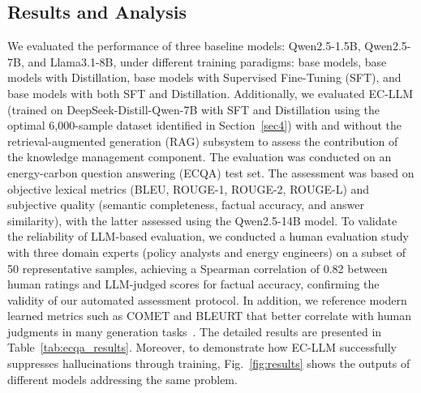 \documentclass[]{interact}
\theoremstyle{plain}%
\theoremstyle{definition}
\theoremstyle{remark}
\begin{document}
\subsection{Results and Analysis}
We evaluated the performance of three baseline models: Qwen2.5-1.5B, Qwen2.5-7B, and Llama3.1-8B, under different training paradigms: base models, base models with Distillation, base models with Supervised Fine-Tuning (SFT), and base models with both SFT and Distillation. Additionally, we evaluated EC-LLM (trained on DeepSeek-Distill-Qwen-7B with SFT and Distillation using the optimal 6,000-sample dataset identified in Section~\ref{sec4}) with and without the retrieval-augmented generation (RAG) subsystem to assess the contribution of the knowledge management component. The evaluation was conducted on an energy-carbon question answering (ECQA) test set. The assessment was based on objective lexical metrics (BLEU, ROUGE-1, ROUGE-2, ROUGE-L) and subjective quality (semantic completeness, factual accuracy, and answer similarity), with the latter assessed using the Qwen2.5-14B model. To validate the reliability of LLM-based evaluation, we conducted a human evaluation study with three domain experts (policy analysts and energy engineers) on a subset of 50 representative samples, achieving a Spearman correlation of 0.82 between human ratings and LLM-judged scores for factual accuracy, confirming the validity of our automated assessment protocol. In addition, we reference modern learned metrics such as COMET and BLEURT that better correlate with human judgments in many generation tasks~\cite{rei2020comet,sellam2020bleurt}. The detailed results are presented in Table~\ref{tab:ecqa_results}. Moreover, to demonstrate how EC-LLM successfully suppresses hallucinations through training, Fig.~\ref{fig:results} shows the outputs of different models addressing the same problem. 
\end{document}
